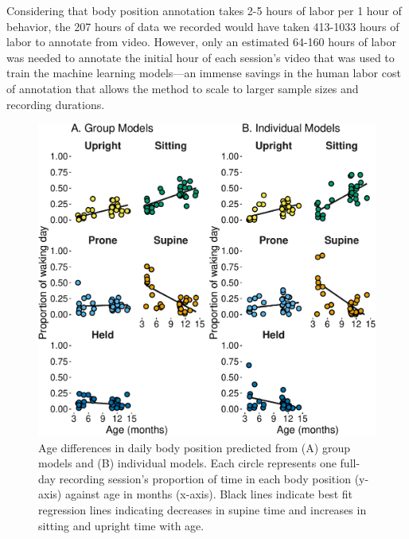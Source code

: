 \documentclass[
  man]{apa6}
\begin{document}
Considering that body position annotation takes 2-5 hours of labor per 1 hour of behavior, the 207 hours of data we recorded would have taken 413-1033 hours of labor to annotate from video. However, only an estimated 64-160 hours of labor was needed to annotate the initial hour of each session's video that was used to train the machine learning models---an immense savings in the human labor cost of annotation that allows the method to scale to larger sample sizes and recording durations.

\begin{figure}

{\centering \includegraphics{manuscript_files/figure-latex/age-1} 

}

\caption{Age differences in daily body position predicted from (A) group models and (B) individual models. Each circle represents one full-day recording session's proportion of time in each body position (y-axis) against age in months (x-axis). Black lines indicate best fit regression lines indicating decreases in supine time and increases in sitting and upright time with age.}\label{fig:age}
\end{figure}
\end{document}
